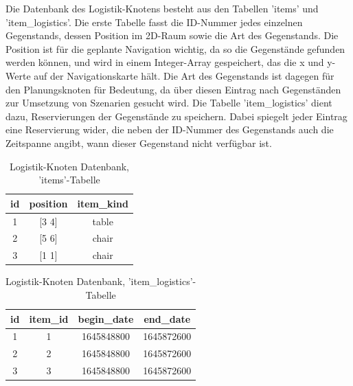 Die Datenbank des Logistik-Knotens besteht aus den Tabellen 'items' und 'item\_logistics'. Die erste Tabelle fasst die ID-Nummer jedes einzelnen Gegenstands, dessen Position im 2D-Raum sowie die Art des Gegenstands. Die Position ist für die geplante Navigation wichtig, da so die Gegenstände gefunden werden können, und wird in einem Integer-Array gespeichert, das die x und y-Werte auf der Navigationskarte hält. Die Art des Gegenstands ist dagegen für den Planungsknoten für Bedeutung, da über diesen Eintrag nach Gegenständen zur Umsetzung von Szenarien gesucht wird. Die Tabelle 'item\_logistics' dient dazu, Reservierungen der Gegenstände zu speichern. Dabei spiegelt jeder Eintrag eine Reservierung wider, die neben der ID-Nummer des Gegenstands auch die Zeitspanne angibt, wann dieser Gegenstand nicht verfügbar ist.

\begin{table}[h]
\begin{center}
\begin{tabular}{| c | c | c |}
  \hline
  \textbf{id} & \textbf{position} & \textbf{item\_kind} \\
  \hline
  \hline
  1           & [3 4]             & table               \\
  2           & [5 6]             & chair               \\
  3           & [1 1]             & chair               \\
  \hline
\end{tabular}
\caption{Logistik-Knoten Datenbank, 'items'-Tabelle}
\end{center}
\end{table}

\begin{table}[h]
\begin{center}
\begin{tabular}{| c | c | c | c |}
  \hline
  \textbf{id} & \textbf{item\_id} & \textbf{begin\_date} & \textbf{end\_date} \\
  \hline
  \hline
  1           & 1                 & 1645848800           & 1645872600         \\
  2           & 2                 & 1645848800           & 1645872600         \\
  3           & 3                 & 1645848800           & 1645872600         \\

  \hline
\end{tabular}
\caption{Logistik-Knoten Datenbank, 'item\_logistics'-Tabelle}
\end{center}
\end{table}

